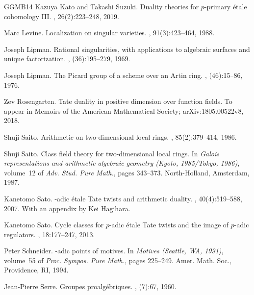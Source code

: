 \documentclass{amsart}
\theoremstyle{remark}
\numberwithin{equation}{section}
\begin{document}
\begin{thebibliography}{GGMB14}
Kazuya Kato and Takashi Suzuki.
\newblock Duality theories for {$p$}-primary \'{e}tale cohomology {III}.
, 26(2):223--248, 2019.

Marc Levine.
\newblock Localization on singular varieties.
, 91(3):423--464, 1988.

Joseph Lipman.
\newblock Rational singularities, with applications to algebraic surfaces and
  unique factorization.
, (36):195--279, 1969.

Joseph Lipman.
\newblock The {P}icard group of a scheme over an {A}rtin ring.
, (46):15--86, 1976.

Zev Rosengarten.
\newblock Tate duality in positive dimension over function fields.
\newblock To appear in Memoirs of the American Mathematical Society;
  arXiv:1805.00522v8, 2018.

Shuji Saito.
\newblock Arithmetic on two-dimensional local rings.
, 85(2):379--414, 1986.

Shuji Saito.
\newblock Class field theory for two-dimensional local rings.
\newblock In {\em Galois representations and arithmetic algebraic geometry
  ({K}yoto, 1985/{T}okyo, 1986)}, volume~12 of {\em Adv. Stud. Pure Math.},
  pages 343--373. North-Holland, Amsterdam, 1987.

Kanetomo Sato.
-adic \'{e}tale {T}ate twists and arithmetic duality.
, 40(4):519--588, 2007.
\newblock With an appendix by Kei Hagihara.

Kanetomo Sato.
\newblock Cycle classes for {$p$}-adic \'{e}tale {T}ate twists and the image of
  {$p$}-adic regulators.
, 18:177--247, 2013.

Peter Schneider.
-adic points of motives.
\newblock In {\em Motives ({S}eattle, {WA}, 1991)}, volume~55 of {\em Proc.
  Sympos. Pure Math.}, pages 225--249. Amer. Math. Soc., Providence, RI, 1994.

Jean-Pierre Serre.
\newblock Groupes proalg\'ebriques.
, (7):67, 1960.


\end{thebibliography}
\end{document}
